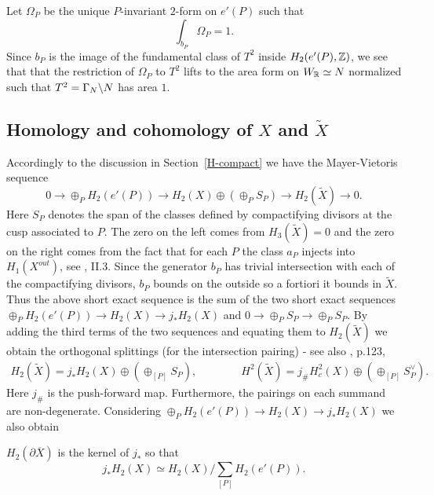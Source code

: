 Let $\Omega_P$ be the unique $P$-invariant $2$-form on $e'(P)$ such that
\begin{equation}\label{areaform}
\int_{b_P} \Omega_P = 1.
\end{equation}
Since $b_P$ is the image of the fundamental class of $T^2$ inside $H_2(e'(P),\mathbb{Z})$, we see that that the restriction of $\Omega_P$ to $T^2$ lifts to the area form on $W_{\mathbb{R}} \simeq N$ normalized such that $T^2=\Gamma_N \backslash N$ has area $1$.


\vskip 0.3in 





\subsection{Homology and cohomology of $X$ and $\tilde{X}$}

Accordingly to the discussion in Section~\ref{H-compact} we have the Mayer-Vietoris sequence
\[
0 \to \oplus_P H_2(e'(P)) \to H_2(X) \oplus (\oplus_P S_P)  \to H_2(\tilde{X}) \to 0.
\]
Here $S_{P}$ denotes the span of the classes defined by compactifying divisors at the cusp associated to $P$. The zero on the left comes from $H_3(\tilde{X}) =0$ and the zero on the right comes from the fact that for each $P$ the class $a_P$ injects into $H_1(X^{out})$, see \cite{vGeer}, II.3. Since the generator $b_P$ has trivial intersection with each of the compactifying divisors, $b_P$ bounds on the outside so a fortiori it bounds in $\tilde{X}$. Thus the above short exact sequence is the sum
of the two short exact sequences $\oplus_P H_2(e'(P)) \to H_2(X) \to j_{\ast} H_2(X)$ and
$ 0 \to \oplus_P S_P \to \oplus_P S_P $.  By adding the third terms of the two sequences and equating them to $H_2(\tilde{X})$  we obtain the orthogonal splittings (for the intersection pairing) - see also \cite{vGeer}, p.123,
\begin{align*}\label{vdG2}
H_2(\tilde{X}) = j_{\ast} H_2(X) \oplus \left( \oplus_{[P]} S_{P} \right), \qquad \qquad 
H^2(\tilde{X})  = j_{\#} H_c^2(X) \oplus \left(\oplus_{[P]} S^{\vee}_{P}\right).
\end{align*}
Here $j_{\#}$ is the push-forward map. Furthermore, the pairings on each summand are non-degenerate. Considering $\oplus_P H_2(e'(P)) \to H_2(X) \to j_{\ast} H_2(X)$ we also obtain
\begin{proposition}\label{intersectionhom}
$H_2(\partial \overline{X})$ is the kernel of $j_{\ast}$ so that
\[
j_{\ast} H_2(X) \simeq H_2(X)/ \sum_{[P]} H_2(e'(P)).
\]
\end{proposition}



